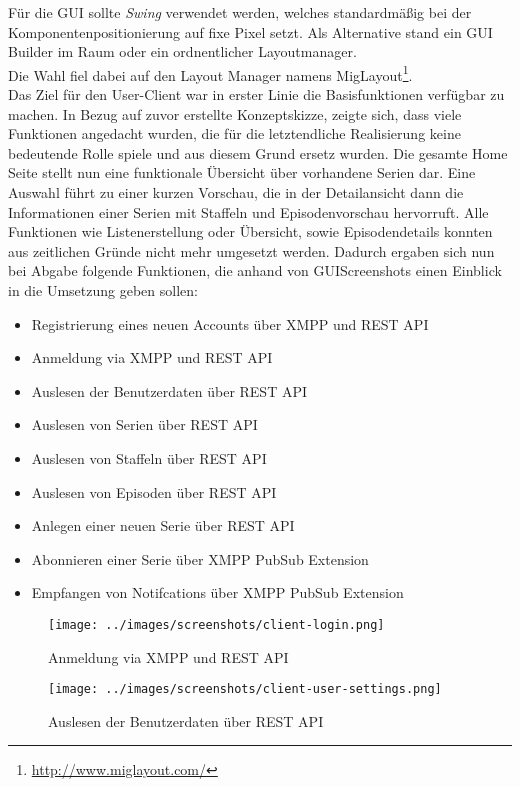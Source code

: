 Für die GUI sollte \textit{Swing} verwendet werden, welches standardmäßig bei der Komponentenpositionierung auf fixe Pixel setzt. Als Alternative stand ein GUI Builder im Raum oder ein ordnentlicher Layoutmanager.\\
Die Wahl fiel dabei auf den Layout Manager namens MigLayout\footnote{\url{http://www.miglayout.com/}}.\\

Das Ziel für den User-Client war in erster Linie die Basisfunktionen verfügbar zu machen. In Bezug auf zuvor erstellte Konzeptskizze, zeigte sich, dass viele Funktionen angedacht wurden, die für die letztendliche Realisierung keine bedeutende Rolle spiele und aus diesem Grund ersetz wurden. Die gesamte Home Seite stellt nun eine funktionale Übersicht über vorhandene Serien dar. Eine Auswahl führt zu einer kurzen Vorschau, die in der Detailansicht dann die Informationen einer Serien mit Staffeln und Episodenvorschau hervorruft. Alle Funktionen wie Listenerstellung oder Übersicht, sowie Episodendetails konnten aus zeitlichen Gründe nicht mehr umgesetzt werden. Dadurch ergaben sich nun bei Abgabe folgende Funktionen, die anhand von GUIScreenshots einen Einblick in die Umsetzung geben sollen:

\begin{itemize}
  \item Registrierung eines neuen Accounts über XMPP und REST API
  \item Anmeldung via XMPP und REST API
  \item Auslesen der Benutzerdaten über REST API
  \item Auslesen von Serien über REST API
  \item Auslesen von Staffeln über REST API
  \item Auslesen von Episoden über REST API
  \item Anlegen einer neuen Serie über REST API
  \item Abonnieren einer Serie über XMPP PubSub Extension
  \item Empfangen von Notifcations über XMPP PubSub Extension
\end{itemize}



\begin{figure}[H]
  \centering
\texttt{[image: ../images/screenshots/client-login.png]}
\caption{Anmeldung via XMPP und REST API}
\label{login}
\end{figure}

\begin{figure}[H]
  \centering
\texttt{[image: ../images/screenshots/client-user-settings.png]}
\caption{Auslesen der Benutzerdaten über REST API}
\label{settings}
\end{figure}

